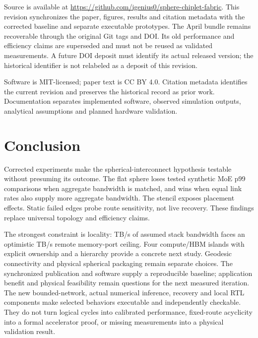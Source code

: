 \documentclass[11pt,a4paper]{article}
\begin{document}
Source is available at
\url{https://github.com/igenius0/sphere-chiplet-fabric}. This revision
synchronizes the paper, figures, results and citation metadata with the
corrected baseline and separate executable prototypes. The April bundle
remains recoverable through the original Git tags and DOI. Its old
performance and efficiency claims are superseded
and must not be reused as validated measurements. A future DOI deposit must
identify its actual released version; the historical identifier is not
relabeled as a deposit of this revision.

Software is MIT-licensed; paper text is CC BY 4.0. Citation metadata
identifies the current revision and preserves the historical record as
prior work. Documentation separates implemented software, observed
simulation outputs, analytical assumptions and planned hardware validation.

\section{Conclusion}

Corrected experiments make the spherical-interconnect hypothesis testable
without presuming its outcome. The flat sphere loses tested synthetic MoE
p99 comparisons when aggregate bandwidth is matched, and wins when equal
link rates also supply more aggregate bandwidth. The stencil exposes
placement effects. Static failed edges probe route sensitivity, not live
recovery. These findings replace universal topology and efficiency claims.

The strongest constraint is locality: \LocalHbmTbps{} TB/s of assumed
stack bandwidth faces an optimistic \RemoteHbmTbps{} TB/s remote
memory-port ceiling. Four compute/HBM islands with explicit ownership and a
hierarchy provide a concrete next study. Geodesic connectivity and physical
spherical packaging remain separate choices. The synchronized publication
and software supply a reproducible baseline; application benefit and
physical feasibility remain questions for the next measured iteration.
The new bounded-network, actual numerical inference, recovery and local RTL
components make selected behaviors executable and independently checkable.
They do not turn logical cycles into calibrated performance, fixed-route
acyclicity into a formal accelerator proof, or missing measurements into a
physical validation result.
\end{document}

